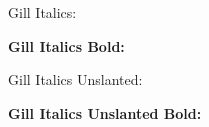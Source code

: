 \documentclass{minimal}
\begin{document}
{\gishape Gill Italics: \lipsum[1]

\bfseries Gill Italics Bold: \lipsum[2]}

{\gushape Gill Italics Unslanted: \lipsum[3]

\bfseries Gill Italics Unslanted Bold: \lipsum[4]}
\end{document}
